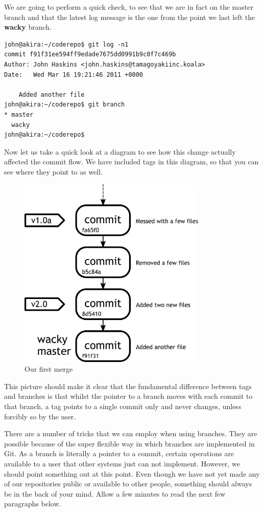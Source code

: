 We are going to perform a quick check, to see that we are in fact on the master branch and that the latest log message is the one from the point we last left the \textbf{wacky} branch.

\begin{Verbatim}[frame=leftline,framerule=1mm,fontsize=\relsize{-3}] 
john@akira:~/coderepo$ git log -n1
commit f91f31ee594ff9edade7675dd0991b9c0f7c469b
Author: John Haskins <john.haskins@tamagoyakiinc.koala>
Date:   Wed Mar 16 19:21:46 2011 +0000

    Added another file
john@akira:~/coderepo$ git branch
* master
  wacky
john@akira:~/coderepo$ 
\end{Verbatim}

Now let us take a quick look at a diagram to see how this change actually affected the commit flow.  We have included tags in this diagram, so that you can see where they point to as well.

\begin{figure}[hbt]
\centering
\includegraphics[width=9cm]{images/f-w4-d2.pdf}
\caption{Our first merge}
\end{figure}

This picture should make it clear that the fundamental difference between tags and branches is that whilst the pointer to a branch moves with each commit to that branch, a tag points to a single commit only and never changes, unless forcibly so by the user.

There are a number of tricks that we can employ when using branches.  They are possible because of the super flexible way in which branches are implemented in Git.  As a branch is literally a pointer to a commit, certain operations are available to a user that other systems just can not implement.  However, we should point something out at this point.  Even though we have not yet made any of our repositories public or available to other people, something should always be in the back of your mind.  Allow a few minutes to read the next few paragraphs below.

